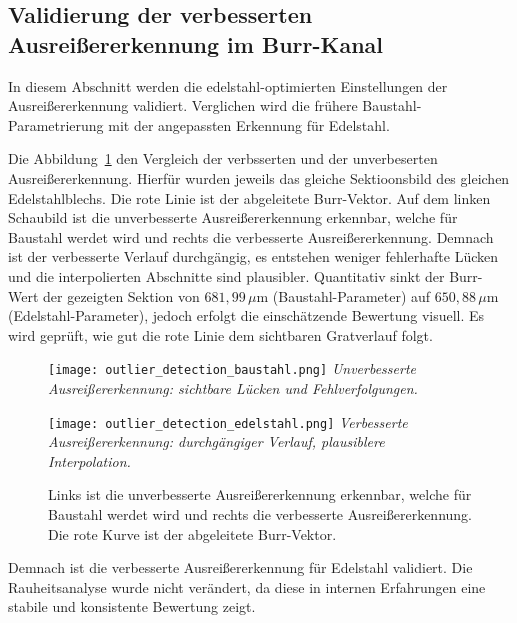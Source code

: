\subsection{Validierung der verbesserten Ausreißererkennung im Burr-Kanal}

In diesem Abschnitt werden die edelstahl-optimierten Einstellungen der Ausreißererkennung validiert. Verglichen wird die frühere Baustahl-Parametrierung mit der angepassten Erkennung für Edelstahl.

Die Abbildung~\ref{fig:burr-compare} den Vergleich der verbsserten und der unverbeserten Ausreißererkennung. Hierfür wurden jeweils das gleiche Sektioonsbild des gleichen Edelstahlblechs. Die rote Linie ist der abgeleitete Burr-Vektor. Auf dem linken Schaubild ist die unverbesserte Ausreißererkennung erkennbar, welche für Baustahl werdet wird und rechts die verbesserte Ausreißererkennung. Demnach ist der verbesserte Verlauf durchgängig, es entstehen weniger fehlerhafte Lücken und die interpolierten Abschnitte sind plausibler. Quantitativ sinkt der Burr-Wert der gezeigten Sektion von \(681{,}99\,\mu\mathrm{m}\) (Baustahl-Parameter) auf \(650{,}88\,\mu\mathrm{m}\) (Edelstahl-Parameter), jedoch erfolgt die einschätzende Bewertung visuell. Es wird geprüft, wie gut die rote Linie dem sichtbaren Gratverlauf folgt.  
\begin{figure}[htbp]
  \centering
  \begin{minipage}[t]{0.48\linewidth}
    \centering
    \texttt{[image: outlier\_detection\_baustahl.png]}
    \vspace{0.3em}
    {\small\emph{Unverbesserte Ausreißererkennung: sichtbare Lücken und Fehlverfolgungen.}}
  \end{minipage}\hfill
  \begin{minipage}[t]{0.48\linewidth}
    \centering
    \texttt{[image: outlier\_detection\_edelstahl.png]}
    \vspace{0.3em}
    {\small\emph{Verbesserte Ausreißererkennung: durchgängiger Verlauf, plausiblere Interpolation.}}
  \end{minipage}
  \caption[Ausreißererkennung im Burr-Kanal]{Links ist die unverbesserte Ausreißererkennung erkennbar, welche für Baustahl werdet wird und rechts die verbesserte Ausreißererkennung. Die rote Kurve ist der abgeleitete Burr-Vektor.}
  \label{fig:burr-compare}
\end{figure}

Demnach ist die verbesserte Ausreißererkennung für Edelstahl validiert. Die Rauheitsanalyse wurde nicht verändert, da diese in internen Erfahrungen eine stabile und konsistente Bewertung zeigt.

